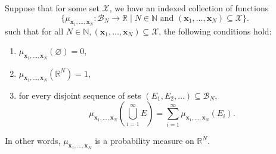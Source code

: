 \begin{theorem}\label{thm:kol-ext}
    Suppose that for some set $\mathcal{X}$, we have an indexed collection of functions
    \begin{equation*}
        \{ \mu_{\mathbf{x}_1, \dots, \mathbf{x}_N} : \mathcal{B}_{N} \to \mathbb{R} \;|\; N \in \mathbb{N} \text{ and } (\mathbf{x}_1, \dots, \mathbf{x}_N) \subseteq \mathcal{X}\}.
    \end{equation*}
    such that for all $N \in \mathbb{N}, (\mathbf{x}_1, \dots, \mathbf{x}_N) \subseteq \mathcal{X}$,
    the following conditions hold:
    \begin{enumerate}
        \item $\mu_{\mathbf{x}_1, \dots, \mathbf{x}_N}( \varnothing) = 0$,

        \item $\mu_{\mathbf{x}_1, \dots, \mathbf{x}_N}(\mathbb{R}^{N}) = 1$,
        \item for every disjoint sequence of sets $(E_1, E_2, \dots) \subseteq \mathcal{B}_N$,
            \begin{equation*}
                \mu_{\mathbf{x}_1, \dots, \mathbf{x}_N}\left(\bigcup_{i = 1}^{\infty}
                E\right) = \sum_{i = 1}^{\infty}\mu_{\mathbf{x}_1, \dots, \mathbf{x}_N}(E_i).
            \end{equation*}
    \end{enumerate}
    In other words, $\mu_{\mathbf{x}_1, \dots, \mathbf{x}_N}$ is a probability measure on $\mathbb{R}^{N}$.


\end{theorem}
